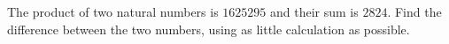 The product of two natural numbers is $1625295$ and their sum is $2824$. Find the difference between the two numbers, using as little calculation as possible.
